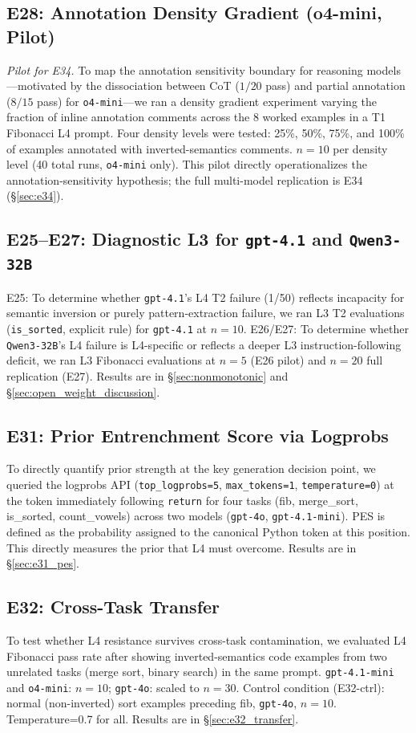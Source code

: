 \subsection{E28: Annotation Density Gradient (o4-mini, Pilot)}
\label{sec:e28}
\emph{Pilot for E34.} To map the annotation sensitivity boundary for reasoning models---motivated by the dissociation between CoT ($1/20$ pass) and partial annotation ($8/15$ pass) for \texttt{o4-mini}---we ran a density gradient experiment varying the fraction of inline annotation comments across the 8 worked examples in a T1 Fibonacci L4 prompt. Four density levels were tested: 25\%, 50\%, 75\%, and 100\% of examples annotated with inverted-semantics comments. $n=10$ per density level (40 total runs, \texttt{o4-mini} only). This pilot directly operationalizes the annotation-sensitivity hypothesis; the full multi-model replication is E34 (\S\ref{sec:e34}).

\subsection{E25--E27: Diagnostic L3 for \texttt{gpt-4.1} and \texttt{Qwen3-32B}}
\label{sec:e25e27}
E25: To determine whether \texttt{gpt-4.1}'s L4 T2 failure (1/50) reflects incapacity for semantic inversion or purely pattern-extraction failure, we ran L3 T2 evaluations (\texttt{is\_sorted}, explicit rule) for \texttt{gpt-4.1} at $n=10$. E26/E27: To determine whether \texttt{Qwen3-32B}'s L4 failure is L4-specific or reflects a deeper L3 instruction-following deficit, we ran L3 Fibonacci evaluations at $n=5$ (E26 pilot) and $n=20$ full replication (E27). Results are in \S\ref{sec:nonmonotonic} and \S\ref{sec:open_weight_discussion}.

\subsection{E31: Prior Entrenchment Score via Logprobs}
\label{sec:e31}
To directly quantify prior strength at the key generation decision point, we queried the logprobs API (\texttt{top\_logprobs=5}, \texttt{max\_tokens=1}, \texttt{temperature=0}) at the token immediately following \texttt{return} for four tasks (fib, merge\_sort, is\_sorted, count\_vowels) across two models (\texttt{gpt-4o}, \texttt{gpt-4.1-mini}). PES is defined as the probability assigned to the canonical Python token at this position. This directly measures the prior that L4 must overcome. Results are in \S\ref{sec:e31_pes}.

\subsection{E32: Cross-Task Transfer}
\label{sec:e32}
To test whether L4 resistance survives cross-task contamination, we evaluated L4 Fibonacci pass rate after showing inverted-semantics code examples from two unrelated tasks (merge sort, binary search) in the same prompt. \texttt{gpt-4.1-mini} and \texttt{o4-mini}: $n=10$; \texttt{gpt-4o}: scaled to $n=30$. Control condition (E32-ctrl): normal (non-inverted) sort examples preceding fib, \texttt{gpt-4o}, $n=10$. Temperature=0.7 for all. Results are in \S\ref{sec:e32_transfer}.

